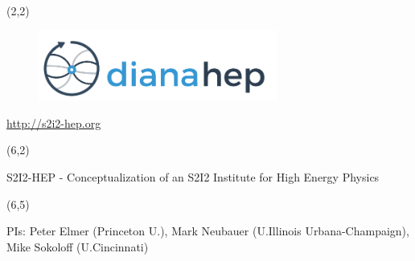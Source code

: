 \documentclass[final]{beamer}
\begin{document}
\begin{frame}{} 

\begin{textblock}{20}(2,2)
\begin{center}
\begin{figure}[tbph]
\centering
\includegraphics[width=0.70\textwidth]{images/diana-hep-06-logo-horizontal.png}
\end{figure}
\url{http://s2i2-hep.org}
\end{center}
\end{textblock}


\begin{textblock}{84.0}(6,2)
\begin{center}
\begin{LARGE}
S2I2-HEP - Conceptualization of an S2I2 Institute for High Energy Physics
\end{LARGE}
\end{center}
\end{textblock}

\begin{textblock}{84.0}(6,5)
\begin{center}
\begin{Large}
PIs: Peter Elmer (Princeton U.), Mark Neubauer (U.Illinois Urbana-Champaign), \\ Mike Sokoloff (U.Cincinnati)
\end{Large}
\end{center}
\end{textblock}


\end{frame}
\end{document}
